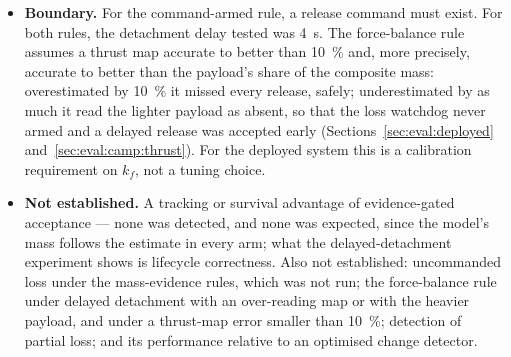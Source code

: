 \begin{spacing}{1.5}
\begin{itemize}
of $240$ flights ($228$ with the watchdog armed), none early in $36$
delayed-detachment flights, against $36$ of $36$ for command-triggered
acceptance, and confirmed real detachments \SIrange{1.9}{2.5}{\second} after
they occurred. It detected $24$ of $24$ uncommanded losses
\SIrange{1.8}{2.5}{\second} after detachment, resetting the payload geometry
and inner-loop scale each time, and accepted none of $24$ releases with a jammed
gripper, all of which ended in a braked hover (Section~\ref{sec:eval:campaign}).
\item \textbf{Boundary.} For the command-armed rule, a release command must
exist. For both rules, the detachment delay tested was \SI{4}{\second}. The
force-balance rule assumes a thrust map accurate to better than
\SI{10}{\percent} and, more precisely, accurate to better than the payload's
share of the composite mass: overestimated by \SI{10}{\percent} it missed every
release, safely; underestimated by as much it read the lighter payload as absent,
so that the loss watchdog never armed and a delayed release was accepted early
(Sections~\ref{sec:eval:deployed} and~\ref{sec:eval:camp:thrust}). For the
deployed system this is a calibration requirement on $k_f$, not a tuning
choice.
\item \textbf{Not established.} A tracking or survival advantage of
evidence-gated acceptance --- none was detected, and none was expected, since the
model's mass follows the estimate in every arm; what the delayed-detachment
experiment shows is lifecycle correctness. Also not established: uncommanded
loss under the mass-evidence rules, which was not run; the force-balance rule
under delayed detachment with an over-reading map or with the heavier payload,
and under a thrust-map error smaller than \SI{10}{\percent}; detection of
partial loss; and its performance relative to an optimised change detector.
\end{itemize}


\end{spacing}
